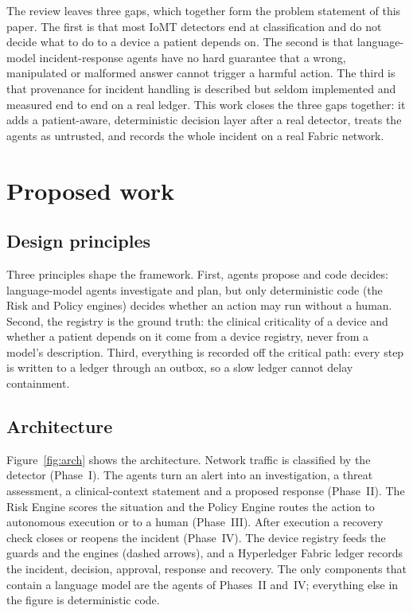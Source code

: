 \documentclass[preprint,12pt]{elsarticle}
\begin{document}
The review leaves three gaps, which together form the problem statement of this paper. The first is that most IoMT detectors end at classification and do not decide what to do to a device a patient depends on. The second is that language-model incident-response agents have no hard guarantee that a wrong, manipulated or malformed answer cannot trigger a harmful action. The third is that provenance for incident handling is described but seldom implemented and measured end to end on a real ledger. This work closes the three gaps together: it adds a patient-aware, deterministic decision layer after a real detector, treats the agents as untrusted, and records the whole incident on a real Fabric network.

\section{Proposed work}
\label{sec:method}

\subsection{Design principles}
Three principles shape the framework. First, agents propose and code decides: language-model agents investigate and plan, but only deterministic code (the Risk and Policy engines) decides whether an action may run without a human. Second, the registry is the ground truth: the clinical criticality of a device and whether a patient depends on it come from a device registry, never from a model's description. Third, everything is recorded off the critical path: every step is written to a ledger through an outbox, so a slow ledger cannot delay containment.

\subsection{Architecture}
Figure~\ref{fig:arch} shows the architecture. Network traffic is classified by the detector (Phase~I). The agents turn an alert into an investigation, a threat assessment, a clinical-context statement and a proposed response (Phase~II). The Risk Engine scores the situation and the Policy Engine routes the action to autonomous execution or to a human (Phase~III). After execution a recovery check closes or reopens the incident (Phase~IV). The device registry feeds the guards and the engines (dashed arrows), and a Hyperledger Fabric ledger records the incident, decision, approval, response and recovery. The only components that contain a language model are the agents of Phases~II and~IV; everything else in the figure is deterministic code.
\end{document}
